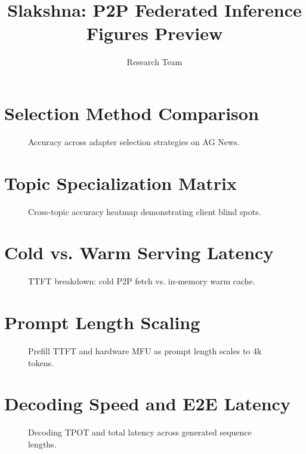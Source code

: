 \documentclass[twocolumn]{article}
\title{\textbf{Slakshna: P2P Federated Inference Figures Preview}}
\author{Research Team}
\date{}
\begin{document}
\maketitle

\section{Selection Method Comparison}
\begin{figure}[h]
\centering

\caption{Accuracy across adapter selection strategies on AG News.}
\label{fig:accuracy_by_selection}
\end{figure}

\section{Topic Specialization Matrix}
\begin{figure}[h]
\centering

\caption{Cross-topic accuracy heatmap demonstrating client blind spots.}
\label{fig:topic_heatmap}
\end{figure}

\section{Cold vs. Warm Serving Latency}
\begin{figure}[h]
\centering

\caption{TTFT breakdown: cold P2P fetch vs. in-memory warm cache.}
\label{fig:latency_cold_warm}
\end{figure}

\section{Prompt Length Scaling}
\begin{figure}[t]
\centering

\caption{Prefill TTFT and hardware MFU as prompt length scales to 4k tokens.}
\label{fig:prompt_length}
\end{figure}

\section{Decoding Speed and E2E Latency}
\begin{figure}[t]
\centering

\caption{Decoding TPOT and total latency across generated sequence lengths.}
\label{fig:output_length}
\end{figure}
\end{document}
